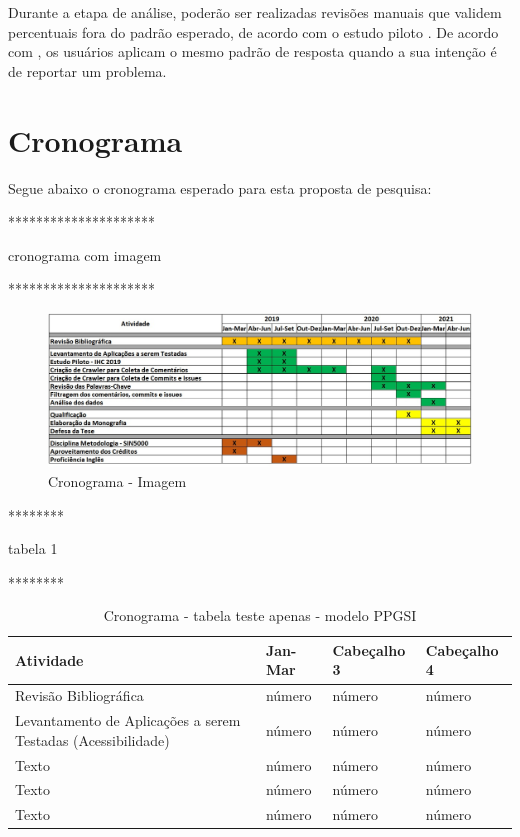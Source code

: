 \begin{itemize}
	Durante a etapa de análise, poderão ser realizadas revisões manuais que validem percentuais fora do padrão esperado, de acordo com o estudo piloto \cite{ihc2019}. De acordo com \cite{Panichella2015how}, os usuários aplicam o mesmo padrão de resposta quando a sua intenção é de reportar um problema.	
\end{itemize}


\section{Cronograma}

Segue abaixo o cronograma esperado para esta proposta de pesquisa:

*********************

cronograma com imagem

*********************


\begin{figure}[!htb]
	\includegraphics[scale=0.55]{imagens/Cronograma-v1.jpg}
	\caption{Cronograma - Imagem}
	\label{fig:cronograma}
\end{figure}


********

tabela 1

********

\begin{table}[htbp]
	\centering
	\caption{Cronograma - tabela teste apenas - modelo PPGSI}
	\begin{tabular}{p{1in} p{1in} p{1in} p{1in} } \hline
		
		Atividade														& Jan-Mar	& Cabeçalho 3	& Cabeçalho 4 \\ \hline
		Revisão Bibliográfica											& número & número	& número \\ 
		Levantamento de Aplicações a serem Testadas (Acessibilidade)	& número & número	& número \\ 
		Texto	& número & número	& número \\ 
		Texto	& número & número	& número \\ 
		Texto	& número & número	& número \\ \hline
		
	\end{tabular}
	\label{tab:cronogramappgsi}
\end{table}


